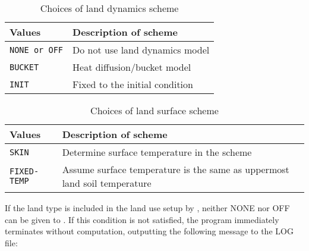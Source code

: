 
\begin{table}[hbt]
\begin{center}
  \caption{Choices of land dynamics scheme}
  \label{tab:nml_land_dyn}
  \begin{tabularx}{150mm}{lX} \hline
    \rowcolor[gray]{0.9}  Values & Description of scheme \\ \hline
      \verb|NONE or OFF| & Do not use land dynamics model \\
      \verb|BUCKET|      & Heat diffusion/bucket model \\
      \verb|INIT|        & Fixed to the initial condition \\
    \hline
  \end{tabularx}
\end{center}
\end{table}

\begin{table}[hbt]
\begin{center}
  \caption{Choices of land surface scheme}
  \label{tab:nml_land_sfc}
  \begin{tabularx}{150mm}{lX} \hline
    \rowcolor[gray]{0.9}  Values & Description of scheme \\ \hline
      \verb|SKIN|       & Determine surface temperature in the scheme \\
      \verb|FIXED-TEMP| & Assume surface temperature is the same as uppermost land soil temperature \\
    \hline
  \end{tabularx}
\end{center}
\end{table}

If the land type is included in the land use setup by , neither NONE nor OFF can be given to . If this condition is not satisfied, the program immediately terminates without computation, outputting the following message to the LOG file:

